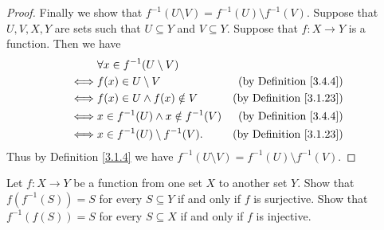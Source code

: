 \begin{proof}
    Finally we show that \(f^{-1}(U \setminus V) = f^{-1}(U) \setminus f^{-1}(V)\).
    Suppose that \(U, V, X, Y\) are sets such that \(U \subseteq Y\) and \(V \subseteq Y\).
    Suppose that \(f : X \to Y\) is a function.
    Then we have
    \begin{align*}
             & \forall x \in f^{-1}(U \setminus V)                                            \\
        \iff & f(x) \in U \setminus V                   & \text{(by Definition \ref{3.4.4})}  \\
        \iff & f(x) \in U \land f(x) \notin V           & \text{(by Definition \ref{3.1.23})} \\
        \iff & x \in f^{-1}(U) \land x \notin f^{-1}(V) & \text{(by Definition \ref{3.4.4})}  \\
        \iff & x \in f^{-1}(U) \setminus f^{-1}(V).     & \text{(by Definition \ref{3.1.23})}
    \end{align*}
    Thus by Definition \ref{3.1.4} we have \(f^{-1}(U \setminus V) = f^{-1}(U) \setminus f^{-1}(V)\).
\end{proof}

\begin{exercise}\label{ex 3.4.5}
    Let \(f : X \to Y\) be a function from one set \(X\) to another set \(Y\).
    Show that \(f(f^{-1}(S)) = S\) for every \(S \subseteq Y\) if and only if \(f\) is surjective.
    Show that \(f^{-1}(f(S)) = S\) for every \(S \subseteq X\) if and only if \(f\) is injective.
\end{exercise}

